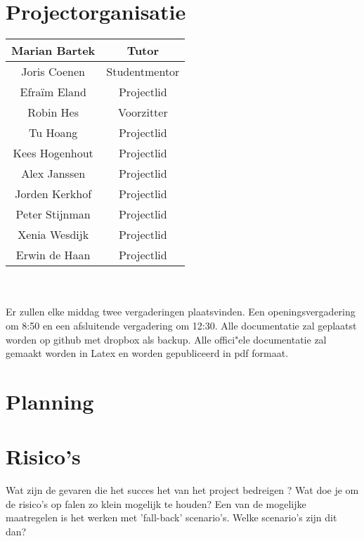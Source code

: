 \documentclass{article}
\begin{document}
\section{Projectorganisatie}
\begin {tabular}{|c|c|}
\hline
Marian Bartek & Tutor\\
\hline
Joris Coenen & Studentmentor\\
\hline
Efraïm Eland & Projectlid\\
\hline
Robin Hes & Voorzitter\\
\hline
Tu Hoang & Projectlid\\
\hline
Kees Hogenhout & Projectlid\\
\hline
Alex Janssen & Projectlid\\
\hline
Jorden Kerkhof & Projectlid\\
\hline
Peter Stijnman & Projectlid\\
\hline
Xenia Wesdijk & Projectlid\\
\hline
Erwin de Haan & Projectlid\\
\hline
\end {tabular}
\\
\\Er zullen elke middag twee vergaderingen plaatsvinden. Een openingsvergadering om 8:50 en een afsluitende vergadering om 12:30.
Alle documentatie zal geplaatst worden op github met dropbox als backup.
Alle offici"ele documentatie zal gemaakt worden in Latex en worden gepubliceerd in pdf formaat.

\section{Planning}





\section{Risico's}
Wat zijn de gevaren die het succes het van het project bedreigen ? Wat doe je om de risico's op falen zo klein mogelijk te houden? Een van de mogelijke maatregelen is het werken met 'fall-back' scenario’s. Welke scenario's zijn dit dan?

\makebibliography
\end{document}
